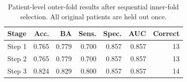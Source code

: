 \begin{table}[t]
\centering
\caption{Patient-level outer-fold results after sequential inner-fold selection. All original patients are held out once.}
\label{tab:nested_stages}
\small
\begin{tabular}{lrrrrrr}
\toprule
Stage & Acc. & BA & Sens. & Spec. & AUC & Correct \\
\midrule
Step 1 & 0.765 & 0.779 & 0.700 & 0.857 & 0.857 & 13 \\
Step 2 & 0.765 & 0.779 & 0.700 & 0.857 & 0.857 & 13 \\
Step 3 & 0.824 & 0.829 & 0.800 & 0.857 & 0.857 & 14 \\
\bottomrule
\end{tabular}
\end{table}
